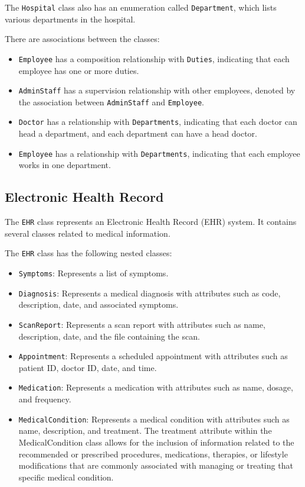 The \texttt{Hospital} class also has an enumeration called \texttt{Department}, which lists various departments in the hospital.

There are associations between the classes:
\begin{itemize}
  \item \texttt{Employee} has a composition relationship with \texttt{Duties}, indicating that each employee has one or more duties.
  \item \texttt{AdminStaff} has a supervision relationship with other employees, denoted by the association between \texttt{AdminStaff} and \texttt{Employee}.
  \item \texttt{Doctor} has a relationship with \texttt{Departments}, indicating that each doctor can head a department, and each department can have a head doctor.
  \item \texttt{Employee} has a relationship with \texttt{Departments}, indicating that each employee works in one department.
\end{itemize}

\subsection{Electronic Health Record}



The \texttt{EHR} class represents an Electronic Health Record (EHR) system. It contains several classes related to medical information.

The \texttt{EHR} class has the following nested classes:
\begin{itemize}
  \item \texttt{Symptoms}: Represents a list of symptoms.
  \item \texttt{Diagnosis}: Represents a medical diagnosis with attributes such as code, description, date, and associated symptoms.
  \item \texttt{ScanReport}: Represents a scan report with attributes such as name, description, date, and the file containing the scan.
  \item \texttt{Appointment}: Represents a scheduled appointment with attributes such as patient ID, doctor ID, date, and time.


  \item \texttt{Medication}: Represents a medication with attributes such as name, dosage, and frequency.
  \item \texttt{MedicalCondition}: Represents a medical condition with attributes such as name, description, and treatment. The treatment attribute within the MedicalCondition class allows for the inclusion of information related to the recommended or prescribed procedures, medications, therapies, or lifestyle modifications that are commonly associated with managing or treating that specific medical condition.
\end{itemize}


